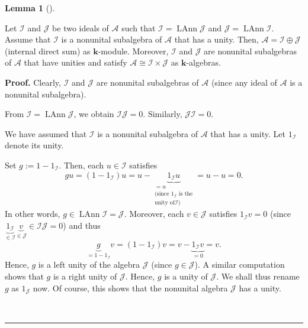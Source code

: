 \documentclass[numbers=enddot,12pt,final,onecolumn,notitlepage]{scrartcl}%
\numberwithin{exer}{subsection}
\theoremstyle{definition}
\newtheorem{lem}[theo]{Lemma}
\newenvironment{lemma}[1][]
{\begin{lem}[#1]\begin{leftbar}}
{\end{leftbar}\end{lem}}
\newenvironment{proof}[1][Proof]{\noindent\textbf{#1.} }{\ \rule{0.5em}{0.5em}}
\begin{document}
\begin{lemma}
\label{lem.IxJ.gen}Let $\mathcal{I}$ and $\mathcal{J}$ be two ideals of
$\mathcal{A}$ such that $\mathcal{I}=\operatorname*{LAnn}\mathcal{J}$ and
$\mathcal{J}=\operatorname*{LAnn}\mathcal{I}$. Assume that $\mathcal{I}$ is a
nonunital subalgebra of $\mathcal{A}$ that has a unity. Then, $\mathcal{A}%
=\mathcal{I}\oplus\mathcal{J}$ (internal direct sum) as $\mathbf{k}$-module.
Moreover, $\mathcal{I}$ and $\mathcal{J}$ are nonunital subalgebras of
$\mathcal{A}$ that have unities and satisfy $\mathcal{A}\cong\mathcal{I}%
\times\mathcal{J}$ as $\mathbf{k}$-algebras.
\end{lemma}

\begin{proof}
Clearly, $\mathcal{I}$ and $\mathcal{J}$ are nonunital subalgebras of
$\mathcal{A}$ (since any ideal of $\mathcal{A}$ is a nonunital subalgebra).

From $\mathcal{I}=\operatorname*{LAnn}\mathcal{J}$, we obtain $\mathcal{IJ}%
=0$. Similarly, $\mathcal{JI}=0$.

We have assumed that $\mathcal{I}$ is a nonunital subalgebra of $\mathcal{A}$
that has a unity. Let $1_{\mathcal{I}}$ denote its unity.

Set $g:=1-1_{\mathcal{I}}$. Then, each $u\in\mathcal{I}$ satisfies%
\[
gu=\left(  1-1_{\mathcal{I}}\right)  u=u-\underbrace{1_{\mathcal{I}}%
u}_{\substack{=u\\\text{(since }1_{\mathcal{I}}\text{ is the}\\\text{unity of
}\mathcal{I}\text{)}}}=u-u=0.
\]
In other words, $g\in\operatorname*{LAnn}\mathcal{I}=\mathcal{J}$. Moreover,
each $v\in\mathcal{J}$ satisfies $1_{\mathcal{I}}v=0$ (since
$\underbrace{1_{\mathcal{I}}}_{\in\mathcal{I}}\underbrace{v}_{\in\mathcal{J}%
}\in\mathcal{IJ}=0$) and thus%
\[
\underbrace{g}_{=1-1_{\mathcal{I}}}v=\left(  1-1_{\mathcal{I}}\right)
v=v-\underbrace{1_{\mathcal{I}}v}_{=0}=v.
\]
Hence, $g$ is a left unity of the algebra $\mathcal{J}$ (since $g\in
\mathcal{J}$). A similar computation shows that $g$ is a right unity of
$\mathcal{J}$. Hence, $g$ is a unity of $\mathcal{J}$. We shall thus rename
$g$ as $1_{\mathcal{J}}$ now. Of course, this shows that the nonunital algebra
$\mathcal{J}$ has a unity.


\end{proof}
\end{document}
